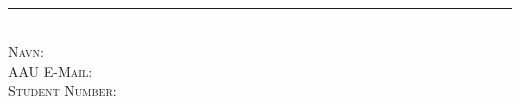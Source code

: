 \thispagestyle{empty}
\begin{flushright}
\vspace{3cm}

\phantom{hul}

\phantom{hul}

\phantom{hul}

{\Huge \textit{\assignmentName}} \\ \vspace{1cm}

\rule{1\textwidth}{3mm} \\ \vspace{1.5cm}
\textsc{
Navn: \writerName\\
AAU E-Mail: \email\\
Student Number: \studyNumber\\
~\\
}

\end{flushright}
